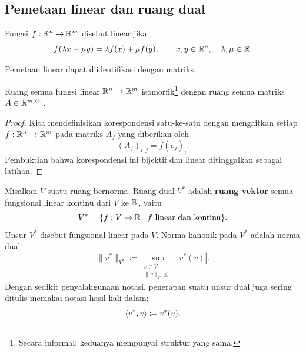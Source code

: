 \subsection{Pemetaan linear dan ruang dual}

\begin{defn}
    Fungsi $f:\mathbb{R}^n\rightarrow\mathbb{R}^m$ disebut linear jika
    \begin{equation}
        f(\lambda x+\mu y)=\lambda f(x)+\mu f(y),
        \qquad x,y\in\mathbb{R}^n,\quad\lambda,\mu\in\mathbb{R}.
    \end{equation}
\end{defn}

Pemetaan linear dapat diidentifikasi dengan matriks.

\begin{theorem}
    Ruang semua fungsi linear $\mathbb{R}^n\rightarrow\mathbb{R}^m$ isomorfik\footnote{Secara
    informal: keduanya mempunyai struktur yang sama.} dengan ruang semua
    matriks $A\in\mathbb{R}^{m\times n}$.
\end{theorem}

\begin{proof}
    Kita mendefinisikan korespondensi satu-ke-satu dengan mengaitkan setiap
    $f:\mathbb{R}^n\rightarrow\mathbb{R}^m$ pada matriks $A_f$ yang diberikan oleh
    \begin{equation}
        (A_f)_{i,j}=f(e_j)_i.
    \end{equation}
    Pembuktian bahwa korespondensi ini bijektif dan linear ditinggalkan sebagai
    latihan.
\end{proof}

\begin{defn}
    Misalkan $V$ suatu ruang bernorma. Ruang dual $V^*$ adalah \textbf{ruang
    vektor} semua fungsional linear kontinu dari $V$ ke $\mathbb{R}$, yaitu
    \begin{equation}
        V^*=\{f:V\rightarrow\mathbb{R}\mid f\text{ linear dan kontinu}\}.
    \end{equation}
    Unsur $V^*$ disebut fungsional linear pada $V$. Norma kanonik pada $V^*$
    adalah norma dual
    \begin{equation}
        \|v^*\|_{V^*}
        \coloneq\sup_{\substack{v\in V\\\|v\|_V\leq1}}|v^*(v)|.
    \end{equation}
    Dengan sedikit penyalahgunaan notasi, penerapan suatu unsur dual juga sering
    ditulis memakai notasi hasil kali dalam:
    \begin{equation}
        \left\langle v^* , v\right\rangle\coloneq v^*(v).
    \end{equation}
\end{defn}


